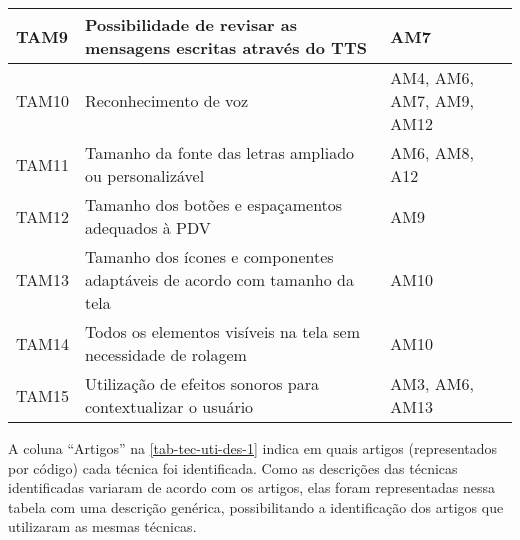 \begin{table}[htb]
\begin{center}
\begin{tabular}{p{1.2cm}|p{9.2cm}|p{4.1cm}}
            \hline
            TAM9            & Possibilidade de revisar as mensagens escritas através do TTS                                      & AM7                                                                  \\
            \hline
            TAM10           & Reconhecimento de voz                                                                              & AM4, AM6, AM7, AM9, AM12                                             \\
            \hline
            TAM11           & Tamanho da fonte das letras ampliado ou personalizável                                             & AM6, AM8, A12                                                        \\
            \hline
            TAM12           & Tamanho dos botões e espaçamentos adequados à PDV                                                  & AM9                                                                  \\
            \hline
            TAM13           & Tamanho dos ícones e componentes adaptáveis de acordo com tamanho da tela                          & AM10                                                                 \\
            \hline
            TAM14           & Todos os elementos visíveis na tela sem necessidade de rolagem                                     & AM10                                                                 \\
            \hline
            TAM15           & Utilização de efeitos sonoros para contextualizar o usuário                                        & AM3, AM6, AM13                                                       \\
        \end{tabular}
    \end{center}
\end{table}

A coluna ``Artigos'' na \autoref{tab-tec-uti-des-1} indica em quais artigos (representados por código) cada técnica foi identificada.
Como as descrições das técnicas identificadas variaram de acordo com os artigos, elas foram representadas nessa tabela
com uma descrição genérica, possibilitando a identificação dos artigos que utilizaram as mesmas técnicas.